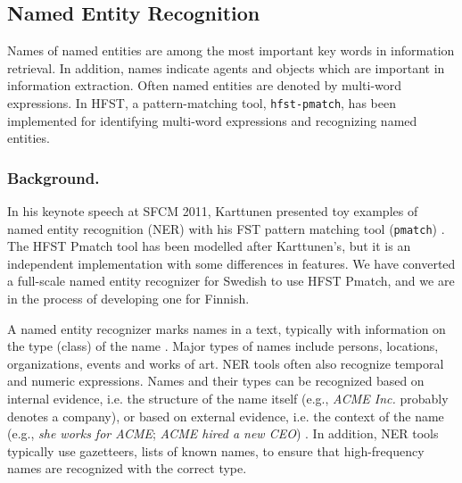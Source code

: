 \documentclass{llncs}
\begin{document}
% 

\subsection{Named Entity Recognition}
Names of named entities are among the most important key words in information retrieval. In addition, names indicate agents and objects which are important in information extraction. Often named entities are denoted by multi-word expressions. In HFST, a pattern-matching tool, {\tt hfst-pmatch}, has been implemented for identifying multi-word expressions and recognizing named entities.

\subsubsection{Background.}
In his keynote speech at SFCM 2011, Karttunen presented toy examples of named entity recognition (NER) with
his FST pattern matching tool (\texttt{pmatch}) \cite{karttunen/2011}. 
The HFST Pmatch tool has been modelled after
Karttunen's, but it is an independent implementation with
some differences in features. We have
converted a full-scale named entity recognizer for Swedish to use
HFST Pmatch, and we are in the process of developing one for Finnish.

A named entity recognizer marks names in a text, typically with
information on the type (class) of the name \cite{nadeau/2007}. Major
types of names include persons, locations, organizations, events and
works of art. NER tools often also recognize temporal and numeric
expressions. Names and their types can be recognized based on internal
evidence, i.e. the structure of the name itself (e.g., \textit{ACME
  Inc.} probably denotes a company), or based on external evidence,
i.e. the context of the name (e.g., \textit{she works for ACME};
\textit{ACME hired a new CEO}) \cite{mcdonald/1996}. In
addition, NER tools typically use gazetteers, lists of known names, to
ensure that high-frequency names are recognized with the correct type.
\end{document}
